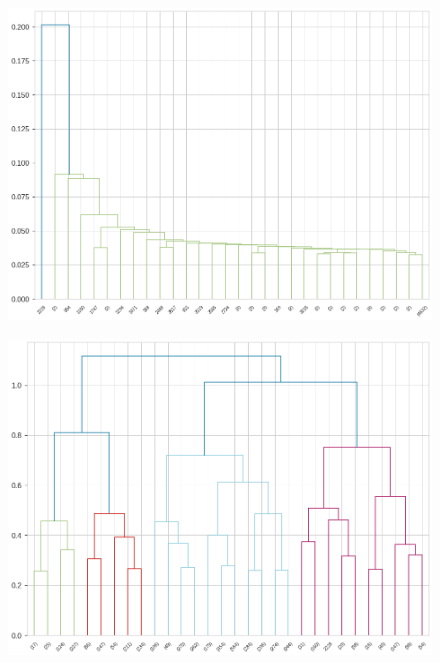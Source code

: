 \documentclass[a4paper,11pt,dvipsnames]{article}
\begin{document}
\begin{figure}[h!]
\begin{minipage}[b]{.25\linewidth}
    \centering
    \includegraphics[width=\textwidth]{Graphs/h_single.png}\label{fig:MIN_dend}
    \end{minipage}\hfill
    \begin{minipage}[b]{.25\linewidth}
    \centering
    \includegraphics[width=\textwidth]{Graphs/h_complete.png}\label{fig:MAX_dend}
    \end{minipage}\hfill
    \begin{minipage}[b]{.25\linewidth}
    \centering

\end{minipage}
\end{figure}
\end{document}
